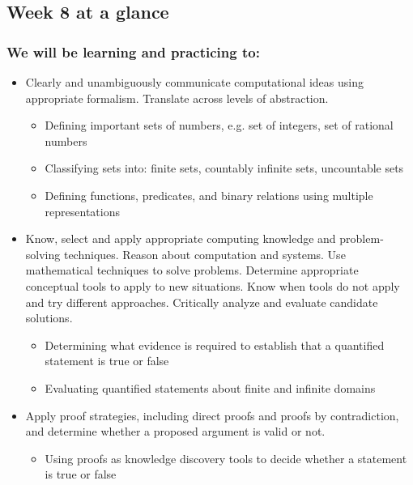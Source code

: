 \documentclass[12pt, oneside]{article}
\begin{document}
\begin{flushright}
\end{flushright} 
\subsection*{Week 8 at a glance}

\subsubsection*{We will be learning and practicing to:}
\begin{itemize}

\item Clearly and unambiguously communicate computational ideas using appropriate formalism. Translate across levels of abstraction.
\begin{itemize}
    \item Defining important sets of numbers, e.g. set of integers, set of rational numbers
    \item Classifying sets into: finite sets, countably infinite sets, uncountable sets
    \item Defining functions, predicates, and binary relations using multiple representations
\end{itemize}

\item Know, select and apply appropriate computing knowledge and problem-solving techniques. Reason about computation and systems. Use mathematical techniques to solve problems. Determine appropriate conceptual tools to apply to new situations. Know when tools do not apply and try different approaches. Critically analyze and evaluate candidate solutions.
\begin{itemize}
    \item Determining what evidence is required to establish that a quantified statement is true or false
    \item Evaluating quantified statements about finite and infinite domains
\end{itemize}

\item Apply proof strategies, including direct proofs and proofs by contradiction, and determine whether a proposed argument is valid or not.
\begin{itemize}
    \item Using proofs as knowledge discovery tools to decide whether a statement is true or false
\end{itemize}
\end{itemize}
\end{document}
